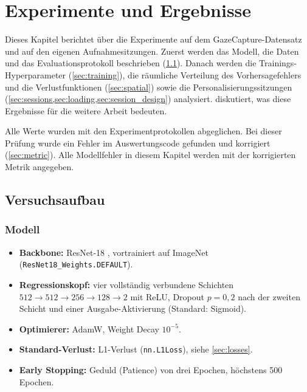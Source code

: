 \documentclass[
  11pt,
  a4paper,
  oneside,
  DIV=12,
  BCOR=8mm,
  parskip=half,
  headings=normal,
  bibliography=totoc,
  listof=totoc
]{scrreprt}
\newcommand{\code}[1]{\texttt{#1}}
\begin{document}
\setcounter{chapter}{3}   %
\chapter{Experimente und Ergebnisse}
\label{ch:results}

Dieses Kapitel berichtet über die Experimente auf dem GazeCapture-Datensatz
\cite{krafka2016itracker} und auf den eigenen Aufnahmesitzungen. Zuerst werden
das Modell, die Daten und das Evaluationsprotokoll beschrieben
(\cref{sec:setup}). Danach werden die Trainings-Hyperparameter
(\cref{sec:training}), die räumliche Verteilung des Vorhersagefehlers und die
Verlustfunktionen (\cref{sec:spatial}) sowie die Personalisierungssitzungen
(\cref{sec:sessions,sec:loading,sec:session_design}) analysiert.
 diskutiert, was diese Ergebnisse für die weitere Arbeit
bedeuten.

Alle Werte wurden mit den Experimentprotokollen abgeglichen. Bei dieser
Prüfung wurde ein Fehler im Auswertungscode gefunden und korrigiert
(\cref{sec:metric}). Alle Modellfehler in diesem Kapitel werden mit der
korrigierten Metrik angegeben.

\section{Versuchsaufbau}
\label{sec:setup}

\subsection{Modell}
\label{sec:model}

\begin{itemize}[nosep]
  \item \textbf{Backbone:} ResNet-18 \cite{he2016resnet}, vortrainiert auf
        ImageNet (\code{ResNet18\_Weights.DEFAULT}).
  \item \textbf{Regressionskopf:} vier vollständig verbundene Schichten
        $512 \to 512 \to 256 \to 128 \to 2$ mit ReLU, Dropout $p=0,2$
        nach der zweiten Schicht und einer Ausgabe-Aktivierung (Standard:
        Sigmoid).
  \item \textbf{Optimierer:} AdamW, Weight Decay $10^{-5}$.
  \item \textbf{Standard-Verlust:} L1-Verlust (\code{nn.L1Loss}), siehe
        \cref{sec:losses}.
  \item \textbf{Early Stopping:} Geduld (Patience) von drei Epochen, höchstens
        500 Epochen.
\end{itemize}
\end{document}
